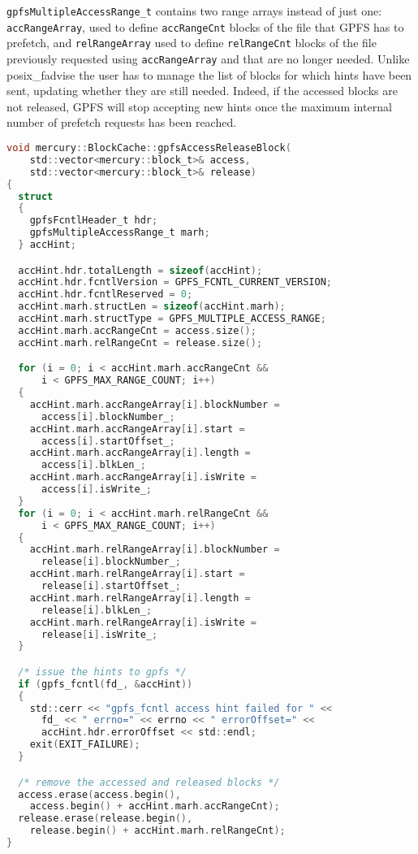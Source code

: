 \texttt{gpfsMultipleAccessRange\_t} contains two range arrays instead of just one: \texttt{accRangeArray}, used to define \texttt{accRangeCnt} blocks of the file that GPFS has to prefetch, and \texttt{relRangeArray} used to define \texttt{relRangeCnt} blocks of the file previously requested using \texttt{accRangeArray} and that are no longer needed. Unlike posix\_fadvise the user has to manage the list of blocks for which hints have been sent, updating whether they are still needed. Indeed, if the accessed blocks are not released, GPFS will stop accepting new hints once the maximum internal number of prefetch requests has been reached. 

\begin{lstlisting}[language=C, caption=Multiple Access Range Hint Initialisation and Submission, label={list: mar_example}]
void mercury::BlockCache::gpfsAccessReleaseBlock(
    std::vector<mercury::block_t>& access, 
    std::vector<mercury::block_t>& release)
{
  struct
  {
    gpfsFcntlHeader_t hdr;
    gpfsMultipleAccessRange_t marh;
  } accHint;

  accHint.hdr.totalLength = sizeof(accHint);
  accHint.hdr.fcntlVersion = GPFS_FCNTL_CURRENT_VERSION;
  accHint.hdr.fcntlReserved = 0;
  accHint.marh.structLen = sizeof(accHint.marh);
  accHint.marh.structType = GPFS_MULTIPLE_ACCESS_RANGE;
  accHint.marh.accRangeCnt = access.size();
  accHint.marh.relRangeCnt = release.size();

  for (i = 0; i < accHint.marh.accRangeCnt && 
      i < GPFS_MAX_RANGE_COUNT; i++)
  {
    accHint.marh.accRangeArray[i].blockNumber = 
      access[i].blockNumber_;
    accHint.marh.accRangeArray[i].start = 
      access[i].startOffset_;
    accHint.marh.accRangeArray[i].length = 
      access[i].blkLen_;
    accHint.marh.accRangeArray[i].isWrite = 
      access[i].isWrite_;
  }
  for (i = 0; i < accHint.marh.relRangeCnt && 
      i < GPFS_MAX_RANGE_COUNT; i++)
  {
    accHint.marh.relRangeArray[i].blockNumber = 
      release[i].blockNumber_;
    accHint.marh.relRangeArray[i].start = 
      release[i].startOffset_;
    accHint.marh.relRangeArray[i].length = 
      release[i].blkLen_;
    accHint.marh.relRangeArray[i].isWrite = 
      release[i].isWrite_;
  }

  /* issue the hints to gpfs */
  if (gpfs_fcntl(fd_, &accHint))
  {
    std::cerr << "gpfs_fcntl access hint failed for " <<
      fd_ << " errno=" << errno << " errorOffset=" <<
      accHint.hdr.errorOffset << std::endl;
    exit(EXIT_FAILURE);
  }

  /* remove the accessed and released blocks */
  access.erase(access.begin(), 
    access.begin() + accHint.marh.accRangeCnt);
  release.erase(release.begin(), 
    release.begin() + accHint.marh.relRangeCnt);
}
\end{lstlisting}

